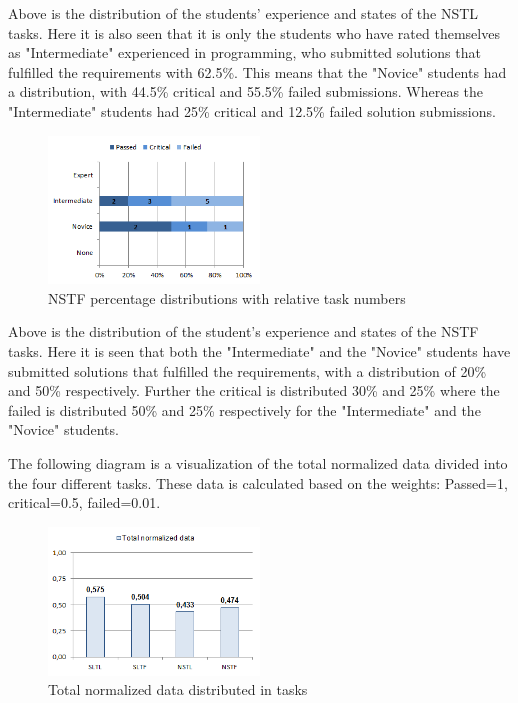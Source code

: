 \documentclass{sig-alternate-05-2015}
\begin{document}
Above is the distribution of the students' experience and states of the NSTL tasks. Here it is also seen that it is only the students who have rated themselves as "Intermediate" experienced in programming, who submitted solutions that fulfilled the requirements with 62.5\%. This means that the "Novice" students had a distribution, with 44.5\% critical and 55.5\% failed submissions. Whereas the "Intermediate" students had 25\% critical and 12.5\% failed solution submissions.

\begin{figure}[H]
	\centering
	\includegraphics[width=0.5\textwidth]{img09}
	\caption{NSTF percentage distributions with relative task numbers}
\end{figure}

Above is the distribution of the student's experience and states of the NSTF tasks. Here it is seen that both the "Intermediate" and the "Novice" students have submitted solutions that fulfilled the requirements, with a distribution of 20\% and 50\% respectively. Further the critical is distributed 30\% and 25\% where the failed is distributed 50\% and 25\% respectively for the "Intermediate" and the "Novice" students.

The following diagram is a visualization of the total normalized data divided into the four different tasks. These data is calculated based on the weights: Passed=1, critical=0.5, failed=0.01.

\begin{figure}[H]
	\centering
	\includegraphics[width=0.5\textwidth]{img10}
	\caption{Total normalized data distributed in tasks}
\end{figure}
\end{document}
